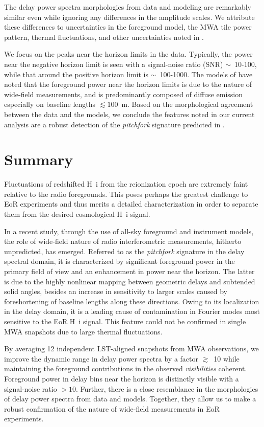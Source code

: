 \documentclass[preprint2,apjl,numberedappendix,twocolappendix,appendixfloats]{emulateapj}
\begin{document}
The delay power spectra morphologies from data and modeling are remarkably similar even while ignoring any differences in the amplitude scales. We attribute these differences to uncertainties in the foreground model, the MWA tile power pattern, thermal fluctuations, and other uncertainties noted in \citet{thy15}. 

We focus on the peaks near the horizon limits in the data. Typically, the power near the negative horizon limit is seen with a signal-noise ratio (SNR) $\sim$~10-100, while that around the positive horizon limit is $\sim$~100-1000. The models of \citet{thy15} have noted that the foreground power near the horizon limits is due to the nature of wide-field measurements, and is predominantly composed of diffuse emission especially on baseline lengths $\lesssim 100$~m. Based on the morphological agreement between the data and the models, we conclude the features noted in our current analysis are a robust detection of the {\it pitchfork} signature predicted in \citet{thy15}.

\section{Summary}\label{sec:summary}

Fluctuations of redshifted H~{\sc i} from the reionization epoch are extremely faint relative to the radio foregrounds. This poses perhaps the greatest challenge to EoR experiments and thus merits a detailed characterization in order to separate them from the desired cosmological H~{\sc i} signal. 

In a recent study, through the use of all-sky foreground and instrument models, the role of wide-field nature of radio interferometric measurements, hitherto unpredicted, has emerged. Referred to as the {\it pitchfork} signature in the delay spectral domain, it is characterized by significant foreground power in the primary field of view and an enhancement in power near the horizon. The latter is due to the highly nonlinear mapping between geometric delays and subtended solid angles, besides an increase in sensitivity to larger scales caused by foreshortening of baseline lengths along these directions. Owing to its localization in the delay domain, it is a leading cause of contamination in Fourier modes most sensitive to the EoR H~{\sc i} signal. This feature could not be confirmed in single MWA snapshots due to large thermal fluctuations. 

By averaging 12 independent LST-aligned snapshots from MWA observations, we improve the dynamic range in delay power spectra by a factor $\gtrsim$~10 while maintaining the foreground contributions in the observed {\it visibilities} coherent. Foreground power in delay bins near the horizon is distinctly visible with a signal-noise ratio $>10$. Further, there is a close resemblance in the morphologies of delay power spectra from data and models. Together, they allow us to make a robust confirmation of the nature of wide-field measurements in EoR experiments.
\end{document}
